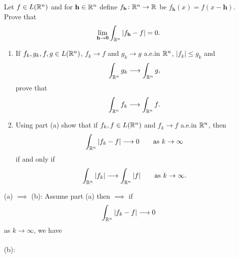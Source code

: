 \begin{problem}
Let $f\in L(\mathbb{R}^n)$ and for $\mathbf{h}\in\mathbb{R}^n$ define
$f_{\mathbf{h}}\colon\mathbb{R}^n\to\mathbb{R}$ be $f_{\mathbf{h}}( x )=
f( x -\mathbf{h})$. Prove that
\[
\lim_{\mathbf{h}\to\mathbf{0}}\int_{\mathbb{R}^n}\left|f_{\mathbf{h}}-f\right|=0.
\]
\end{problem}
\begin{solution}
\end{solution}

\begin{problem}
\begin{enumerate}[label=(\alph*),noitemsep]
\item If $f_k,g_k,f,g\in L(\mathbb{R}^n)$, $f_k\to f$ and $g_k\to g$ a.e.\@ in
  $\mathbb{R}^n$, $|f_k|\leq g_k$ and
\[
\int_{\mathbb{R}^n}g_k\longrightarrow\int_{\mathbb{R}^n}g,
\]
prove that
\[
\int_{\mathbb{R}^n} f_k\longrightarrow\int_{\mathbb{R}^n}f.
\]
\item Using part (a) show that if $f_k,f\in L(\mathbb{R}^n)$ and $f_k\to f$
  a.e.\@ in $\mathbb{R}^n$, then
\[
\int_{\mathbb{R}^n}|f_k-f|\longrightarrow 0\qquad\text{as $k\to\infty$}
\]
if and only if
\[
\int_{\mathbb{R}^n}|f_k|\longrightarrow\int_{\mathbb{R}^n}|f|\qquad\text{as $k\to\infty$}.
\]
\end{enumerate}
\end{problem}
\begin{solution}
(a) $\implies$ (b): Assume part (a) then $\implies$ if
\begin{equation}
\label{eq:prep:2:12}
\int_{\mathbb{R}^n}|f_k-f|\longrightarrow 0
\end{equation}
as $k\to\infty$, we have
\\\\
(b):
\end{solution}

